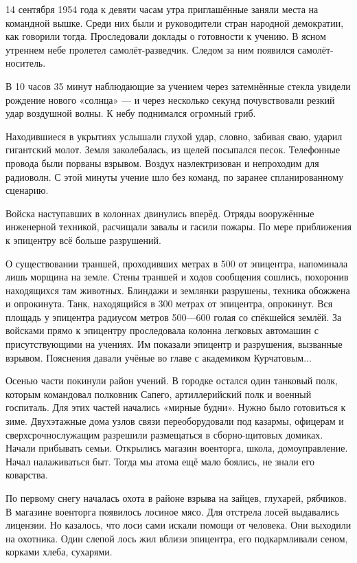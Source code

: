 14 сентября 1954 года к девяти часам утра приглашённые заняли места на командной вышке.
Среди них были и руководители стран народной демократии, как говорили тогда.
Проследовали доклады о готовности к учению.
В ясном утреннем небе пролетел самолёт-разведчик.
Следом за ним появился самолёт-носитель.

В 10 часов 35 минут наблюдающие за учением через затемнённые стекла увидели рождение нового «солнца» — и через несколько секунд почувствовали резкий удар воздушной волны.
К небу поднимался огромный гриб.

Находившиеся в укрытиях услышали глухой удар, словно, забивая сваю, ударил гигантский молот.
Земля заколебалась, из щелей посыпался песок.
Телефонные провода были порваны взрывом.
Воздух наэлектризован и непроходим для радиоволн.
С этой минуты учение шло без команд, по заранее спланированному сценарию.

Войска наступавших в колоннах двинулись вперёд. Отряды вооружённые инженерной техникой, расчищали завалы и гасили пожары.
По мере приближения к эпицентру всё больше разрушений.

О существовании траншей, проходивших метрах в 500 от эпицентра, напоминала лишь морщина на земле.
Стены траншей и ходов сообщения сошлись, похоронив находящихся там животных.
Блиндажи и землянки разрушены, техника обожжена и опрокинута.
Танк, находящийся в 300 метрах от эпицентра, опрокинут.
Вся площадь у эпицентра радиусом метров 500—600 голая со спёкшейся землёй.
За войсками прямо к эпицентру проследовала колонна легковых автомашин с присутствующими на учениях.
Им показали эпицентр и разрушения, вызванные взрывом.
Пояснения давали учёные во главе с академиком Курчатовым...

Осенью части покинули район учений.
В городке остался один танковый полк, которым командовал полковник Сапего, артиллерийский полк и военный госпиталь.
Для этих частей начались «мирные будни».
Нужно было готовиться к зиме.
Двухэтажные дома узлов связи переоборудовали под казармы, офицерам и сверхсрочнослужащим разрешили размещаться в
сборно-щитовых домиках.
Начали прибывать семьи.
Открылись магазин военторга, школа, домоуправление.
Начал налаживаться быт.
Тогда мы атома ещё мало боялись, не знали его коварства.

По первому снегу началась охота в районе взрыва на зайцев, глухарей, рябчиков.
В магазине военторга появилось лосиное мясо.
Для отстрела лосей выдавались лицензии.
Но казалось, что лоси сами искали помощи от человека.
Они выходили на охотника.
Один слепой лось жил вблизи эпицентра, его подкармливали сеном, корками хлеба, сухарями.

